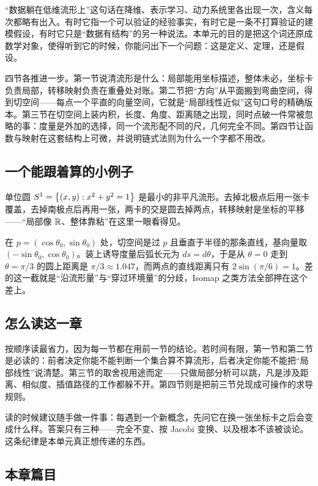 ``数据躺在低维流形上''这句话在降维、表示学习、动力系统里各出现一次，含义每次都略有出入。有时它指一个可以验证的经验事实，有时它是一条不打算验证的建模假设，有时它只是``数据有结构''的另一种说法。本单元的目的是把这个词还原成数学对象，使得听到它的时候，你能问出下一个问题：这是定义、定理，还是假设。

四节各推进一步。第一节说清流形是什么：局部能用坐标描述，整体未必，坐标卡负责局部，转移映射负责在重叠处对账。第二节把``方向''从平面搬到弯曲空间，得到切空间——每点一个平直的向量空间，它就是``局部线性近似''这句口号的精确版本。第三节在切空间上装内积，长度、角度、距离随之出现，同时点破一件常被忽略的事：度量是外加的选择，同一个流形配不同的尺，几何完全不同。第四节让函数与映射在这套结构上可微，并说明链式法则为什么一个字都不用改。

\subsection{一个能跟着算的小例子}

单位圆 \(S^{1}=\left\{(x,y):x^{2}+y^{2}=1\right\}\) 是最小的非平凡流形。去掉北极点后用一张卡覆盖，去掉南极点后再用一张，两卡的交是圆去掉两点，转移映射是坐标的平移——``局部像 \(\mathbb{R}\)、整体靠粘''在这里一眼看得见。

在 \(p=(\cos\theta_{0},\sin\theta_{0})\) 处，切空间是过 \(p\) 且垂直于半径的那条直线，基向量取 \((-\sin\theta_{0},\cos\theta_{0})\)。装上诱导度量后弧长元为 \(ds=d\theta\)，于是从 \(\theta=0\) 走到 \(\theta=\pi/3\) 的圆上距离是 \(\pi/3\approx1.047\)，而两点的直线距离只有 \(2\sin(\pi/6)=1\)。差的这一截就是``沿流形量''与``穿过环境量''的分歧，Isomap 之类方法全部押在这个差上。

\subsection{怎么读这一章}

按顺序读最省力，因为每一节都在用前一节的结论。若时间有限，第一节和第二节是必读的：前者决定你能不能判断一个集合算不算流形，后者决定你能不能把``局部线性''说清楚。第三节的取舍视用途而定——只做局部分析可以跳，凡是涉及距离、相似度、插值路径的工作都躲不开。第四节则是把前三节兑现成可操作的求导规则。

读的时候建议随手做一件事：每遇到一个新概念，先问它在换一张坐标卡之后会变成什么样。答案只有三种——完全不变、按 Jacobi 变换、以及根本不该被谈论。这条纪律是本单元真正想传递的东西。

\subsection{本章篇目}

